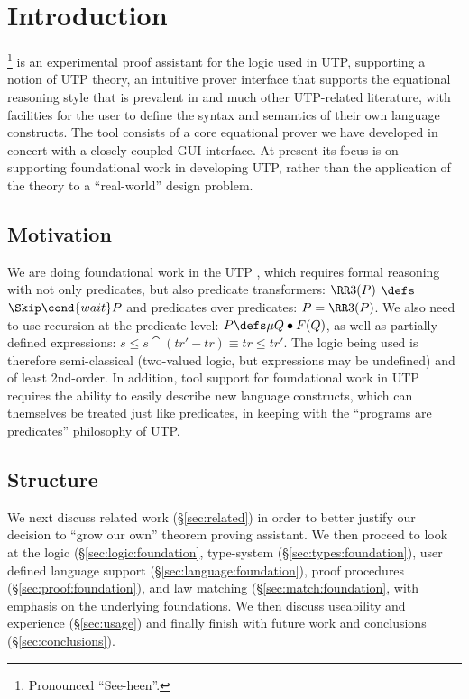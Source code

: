 \section{Introduction}

\STHN\footnote{Pronounced ``See-heen''.}
is an experimental proof assistant for the logic used in UTP,
supporting a notion of UTP theory, an intuitive prover interface
that supports the equational reasoning style that is prevalent in \cite{UTP-book}
and much other UTP-related literature,
with facilities for the user to define the syntax and semantics
of their own language constructs.
The tool consists of a core equational prover we have developed
in concert with a closely-coupled GUI interface.
At present its focus is on supporting foundational work in developing UTP,
rather than the application of the theory to a ``real-world'' design problem.


\subsection{Motivation}

We are doing foundational work in the UTP \cite{UTP-book},
which requires formal reasoning with not only predicates,
but also predicate transformers: $\RR3(P)$ $\defs$ $\Skip \cond{wait} P$
and predicates over predicates: $P = \RR3(P)$.
We also need to use recursion at the predicate level:
$ P \defs \mu Q \bullet F(Q)$,
as well as partially-defined expressions:
$s \le s \cat (tr'-tr) \equiv  tr \le tr'$.
The logic being used is therefore semi-classical
(two-valued logic, but expressions may be undefined)
and of least 2nd-order.
In addition, tool support for foundational work in UTP requires the ability
to easily describe new language constructs,
which can themselves be treated just like predicates,
in keeping with the ``programs are predicates''
philosophy \cite{conf/mlpl/Hoare85} of UTP.


\subsection{Structure}

We next discuss related work (\S\ref{sec:related}) in order to better justify
our decision to ``grow our own'' theorem proving assistant.
We then proceed to look at the logic (\S\ref{sec:logic:foundation},
type-system (\S\ref{sec:types:foundation}),
user defined language support (\S\ref{sec:language:foundation}),
proof procedures (\S\ref{sec:proof:foundation}),
and law matching (\S\ref{sec:match:foundation},
with emphasis on the underlying foundations.
We then discuss useability and experience (\S\ref{sec:usage})
and finally finish with  future work and conclusions (\S\ref{sec:conclusions}).
